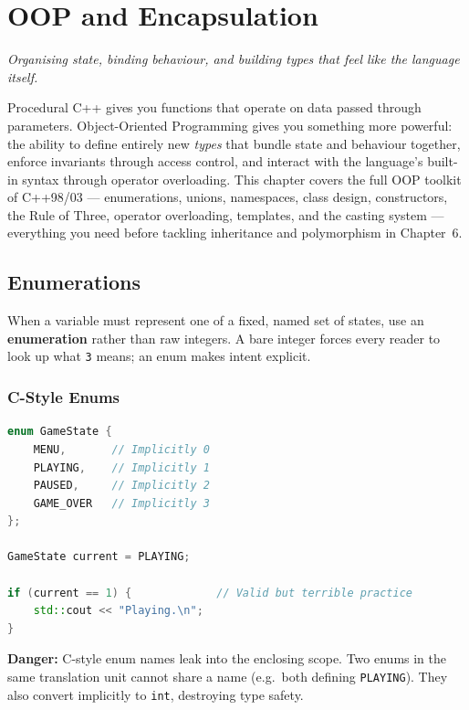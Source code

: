 \chapter{OOP and Encapsulation}
\label{ch:oop-encapsulation}

\textit{Organising state, binding behaviour, and building types that feel like the language itself.}

Procedural C++ gives you functions that operate on data passed through parameters. Object-Oriented Programming gives you something more powerful: the ability to define entirely new \textit{types} that bundle state and behaviour together, enforce invariants through access control, and interact with the language's built-in syntax through operator overloading. This chapter covers the full OOP toolkit of C++98/03 --- enumerations, unions, namespaces, class design, constructors, the Rule of Three, operator overloading, templates, and the casting system --- everything you need before tackling inheritance and polymorphism in Chapter~6.

\section{Enumerations}
\label{sec:enumerations}

When a variable must represent one of a fixed, named set of states, use an \textbf{enumeration} rather than raw integers. A bare integer forces every reader to look up what \texttt{3} means; an enum makes intent explicit.

\subsection{C-Style Enums}

\begin{lstlisting}[language=C++, caption={C-style (unscoped) enumeration}]
enum GameState {
    MENU,       // Implicitly 0
    PLAYING,    // Implicitly 1
    PAUSED,     // Implicitly 2
    GAME_OVER   // Implicitly 3
};

GameState current = PLAYING;

if (current == 1) {             // Valid but terrible practice
    std::cout << "Playing.\n";
}
\end{lstlisting}

\textbf{Danger:} C-style enum names leak into the enclosing scope. Two enums in the same translation unit cannot share a name (e.g.\ both defining \texttt{PLAYING}). They also convert implicitly to \texttt{int}, destroying type safety.

